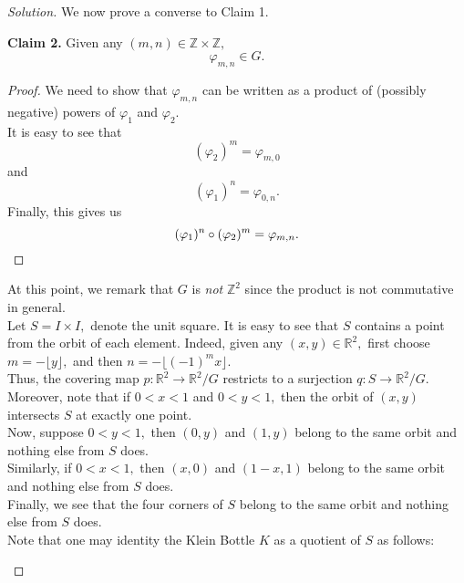 \documentclass[12pt]{article}
\newenvironment{blockquote}
{\begin{mdframed}[skipabove=0pt, skipbelow=0pt, innertopmargin=4pt, innerbottommargin=4pt, bottomline=false,topline=false,rightline=false, linewidth=2pt]}
{\end{mdframed}}
\newenvironment{soln}{\begin{proof}[Solution]}{\end{proof}}
\begin{document}
\begin{soln}
		We now prove a converse to Claim 1.
		\begin{blockquote}
			\textbf{Claim 2.} Given any $(m, n) \in \mathbb{Z}\times\mathbb{Z},$ 
			\begin{equation*} 
				\varphi_{m, n} \in G.
			\end{equation*}
			\begin{proof} 
				We need to show that $\varphi_{m, n}$ can be written as a product of (possibly negative) powers of $\varphi_1$ and $\varphi_2.$\\
				It is easy to see that
				\begin{equation*} 
					(\varphi_2)^m = \varphi_{m, 0}
				\end{equation*}
				and
				\begin{equation*} 
					(\varphi_1)^n = \varphi_{0, n}.
				\end{equation*}
				Finally, this gives us
				\begin{equation*} 
					(\varphi_1)^n\circ(\varphi_2)^m = \varphi_{m, n}. \qedhere
				\end{equation*}
			\end{proof}
		\end{blockquote}
		At this point, we remark that $G$ is \emph{not} $\mathbb{Z}^2$ since the product is not commutative in general.\\
		Let $S = I \times I,$ denote the unit square. It is easy to see that $S$ contains a point from the orbit of each element. Indeed, given any $(x, y) \in \mathbb{R}^2,$ first choose $m = -\lfloor y \rfloor,$ and then $n = -\lfloor (-1)^mx \rfloor.$\\
		Thus, the covering map $p:\mathbb{R}^2 \to \mathbb{R}^2/G$ restricts to a surjection $q:S \to \mathbb{R}^2/G.$\\
		Moreover, note that if $0 < x < 1$ and $0 < y < 1,$ then the orbit of $(x, y)$ intersects $S$ at exactly one point.\\
		Now, suppose $0 < y < 1,$ then $(0, y)$ and $(1, y)$ belong to the same orbit and nothing else from $S$ does.\\
		Similarly, if $0 < x < 1,$ then $(x, 0)$ and $(1 - x, 1)$ belong to the same orbit and nothing else from $S$ does.\\
		Finally, we see that the four corners of $S$ belong to the same orbit and nothing else from $S$ does.\\
		Note that one may identity the Klein Bottle $K$ as a quotient of $S$ as follows:
		\begin{center}
			\begin{tikzpicture}

\end{tikzpicture}
\end{center}
\end{soln}
\end{document}
